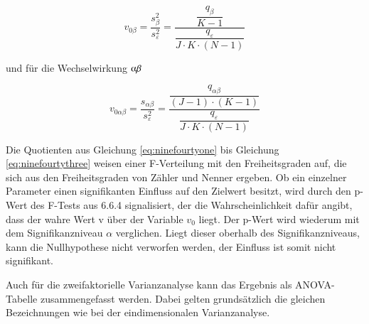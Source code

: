 \begin{equation}\label{eq:ninefourtytwo}
v_{0\beta} =\dfrac{s_{\beta}^{2}}{s_{\varepsilon}^{2}} =\dfrac{\dfrac{q_{\beta}}{K-1}}{\dfrac{q_{\varepsilon}}{J\cdot K\cdot (N-1)}}
\end{equation}

\noindent und f\"{u}r die Wechselwirkung $\alphaup\beta$

\begin{equation}\label{eq:ninefourtythree}
v_{0\alpha \beta} =\dfrac{s_{\alpha \beta}}{s_{\varepsilon}^{2}} =\dfrac{\dfrac{q_{\alpha \beta}}{(J-1)\cdot (K-1)}}{\dfrac{q_{\varepsilon}}{J\cdot K\cdot (N-1)}}
\end{equation}

\noindent Die Quotienten aus Gleichung \eqref{eq:ninefourtyone} bis Gleichung \eqref{eq:ninefourtythree} weisen einer F-Verteilung mit den Freiheitsgraden auf, die sich aus den Freiheitsgraden von Z\"{a}hler und Nenner ergeben. Ob ein einzelner Parameter einen signifikanten Einfluss auf den Zielwert besitzt, wird durch den p-Wert des F-Tests aus 6.6.4 signalisiert, der die Wahrscheinlichkeit daf\"{u}r angibt, dass der wahre Wert v \"{u}ber der Variable $v_{0}$ liegt. Der p-Wert wird wiederum mit dem Signifikanzniveau $\alpha$ verglichen. Liegt dieser oberhalb des Signifikanzniveaus, kann die Nullhypothese nicht verworfen werden, der Einfluss ist somit nicht signifikant.\newline

\noindent Auch f\"{u}r die zweifaktorielle Varianzanalyse kann das Ergebnis als ANOVA-Tabelle zusammengefasst werden. Dabei gelten grunds\"{a}tzlich die gleichen Bezeichnungen wie bei der eindimensionalen Varianzanalyse.

\clearpage

